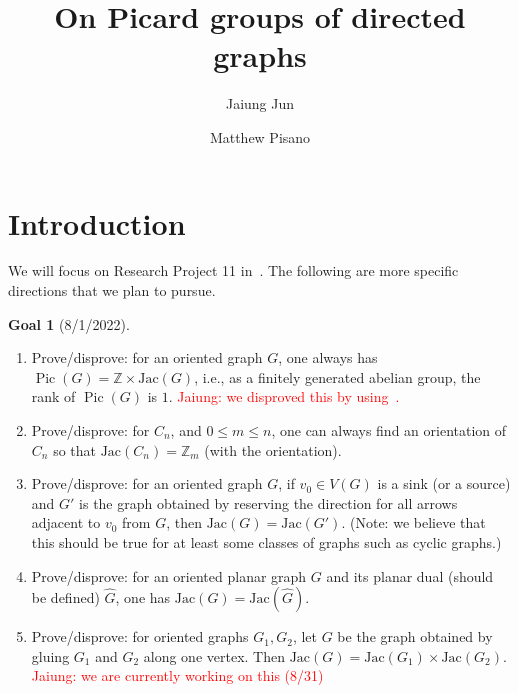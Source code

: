 \documentclass[11pt,reqno]{amsart}
\DeclareMathOperator{\Pic}{Pic}
\newcommand{\Jac}{\textrm{Jac}}{}
\theoremstyle{definition}
\newtheorem*{goal}{\textbf{Goal}}
\theoremstyle{plain}
\begin{document}
\title{On Picard groups of directed graphs}
%

\author{Jaiung Jun}
\address{Department of Mathematics, State University of New York at New Paltz, NY 12561, USA}

\author{Matthew Pisano}
\address{Department of Mathematics, State University of New York at New Paltz, NY 12561, USA}


%

%
\makeatletter
{}
\makeatother


\begin{abstract}

\end{abstract}

\maketitle


\section{Introduction}

	We will focus on Research Project 11 in~\cite{glass2020chip}.
	The following are more specific directions that we plan to pursue.

	\begin{goal}[8/1/2022]$ $
		\begin{enumerate}
			\item
			Prove/disprove: for an oriented graph $G$, one always has $\Pic(G)=\mathbb{Z} \times \Jac(G)$, 
			i.e., as a finitely generated abelian group, the rank of $\Pic(G)$ is $1$.
			\textcolor{red}{Jaiung: we disproved this by using~\cite{wagner2000critical}.}
			\item
			Prove/disprove: for $C_n$, and $0 \leq m \leq n$, one can always find an orientation
			of $C_n$ so that $\Jac(C_n)=\mathbb{Z}_m$ (with the orientation).
			\item
			Prove/disprove: for an oriented graph $G$, if $v_0 \in V(G)$ is a sink (or a source)
			and $G'$ is the graph obtained by reserving the direction for all arrows adjacent
			to $v_0$ from $G$, then $\Jac(G)=\Jac(G')$. (Note: we believe that this should be true
			for at least some classes of graphs such as cyclic graphs.)
			\item
			Prove/disprove: for an oriented planar graph $G$ and its planar dual (should be defined)
			$\hat{G}$, one has $\Jac(G)=\Jac(\hat{G})$.
			\item
			Prove/disprove: for oriented graphs $G_1,G_2$, let $G$ be the graph obtained by
			gluing $G_1$ and $G_2$ along one vertex. Then $\Jac(G)=\Jac(G_1) \times \Jac(G_2)$.
			\textcolor{red}{Jaiung: we are currently working on this (8/31)}
		\end{enumerate}
	\end{goal}
\end{document}
